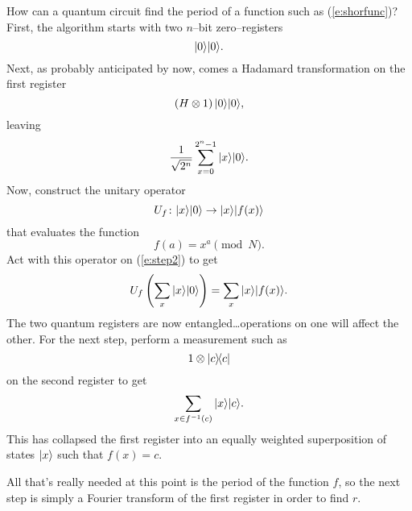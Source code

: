 How can a quantum circuit find the period of a function
such as (\ref{e:shorfunc})?  First, the algorithm starts
with two $n$--bit zero--registers
\begin{equation}
{|{0}\rangle}{|{0}\rangle}.
\end{equation}
Next, as probably anticipated by now, comes a Hadamard
transformation on the first register 
\begin{equation}
\left( H\otimes 1 \right) {|{0}\rangle}{|{0}\rangle},
\end{equation}
leaving
\begin{equation}
\frac{1}{\sqrt{2^n}}\sum_{x=0}^{2^n-1} {|{x}\rangle}{|{0}\rangle}.
\label{e:step2}
\end{equation}
Now, construct the unitary operator
\begin{equation}
U_f\colon{|{x}\rangle}{|{0}\rangle}\to{|{x}\rangle}{|{f(x)}\rangle}
\end{equation}
that evaluates the function
\begin{equation}
f(a) = x^a\pmod{N}.
\end{equation}
Act with this operator on (\ref{e:step2}) to get
\begin{equation}
U_f \left( \sum_{x} {|{x}\rangle}{|{0}\rangle} \right)
= \sum_{x} {|{x}\rangle}{|{f(x)}\rangle}.
\end{equation}
The two quantum registers are now entangled\dots operations on
one will affect the other.  For the next step, 
perform a measurement such as
\begin{equation}
1\otimes {|{c}\rangle\!\langle{c}|}
\end{equation}
on the second register to get
\begin{equation}
\sum_{x\in f^{-1}(c)} {|{x}\rangle}{|{c}\rangle}.
\label{e:shorB}
\end{equation}
This has collapsed the first register into an equally weighted
superposition of states ${|{x}\rangle}$ such that $f(x) = c$.  

All that's really needed at this point is the period of the function
$f$, so the next step is simply a Fourier transform of the first 
register in order to find $r$.  

